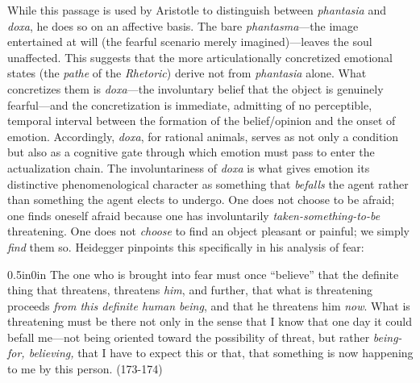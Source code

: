 \documentclass{article}
\begin{document}
While this passage is used by Aristotle to distinguish between \textit{phantasia} and \textit{doxa}, he does so on an affective basis. The bare \textit{phantasma}---the image entertained at will (the fearful scenario merely imagined)---leaves the soul unaffected. This suggests that the more articulationally concretized emotional states (the \textit{pathe} of the \textit{Rhetoric}) derive not from \textit{phantasia} alone. What concretizes them is \textit{doxa}---the involuntary belief that the object is genuinely fearful---and the concretization is immediate, admitting of no perceptible, temporal interval between the formation of the belief/opinion and the onset of emotion. Accordingly, \textit{doxa}, for rational animals, serves as not only a condition but also as a cognitive gate through which emotion must pass to enter the actualization chain. The involuntariness of \textit{doxa} is what gives emotion its distinctive phenomenological character as something that \textit{befalls} the agent rather than something the agent elects to undergo. One does not choose to be afraid; one finds oneself afraid because one has involuntarily \textit{taken-something-to-be} threatening. One does not \textit{choose} to find an object pleasant or painful; we simply \textit{find} them so. Heidegger pinpoints this specifically in his analysis of fear: 
\begin{adjustwidth}{0.5in}{0in}
    The one who is brought into fear must once ``believe'' that the definite thing that threatens, threatens \textit{him}, and further, that what is threatening proceeds \textit{from this definite human being}, and that he threatens him \textit{now}. What is threatening must be there not only in the sense that I know that one day it could befall me---not being oriented toward the possibility of threat, but rather \textit{being-for, believing,} that I have to expect this or that, that something is now happening to me by this person. (173-174)
\end{adjustwidth}
\end{document}

